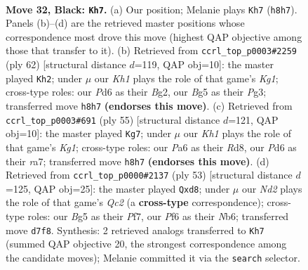 \documentclass[11pt]{article}
\begin{document}
\clearpage

\begin{figure}[p]\centering
\begin{subfigure}{0.46\textwidth}\centering
\resizebox{\linewidth}{!}{%
\newchessgame
\chessboard[
  setfen={rnR4k/3n4/p2p1p2/3P2b1/4P1P1/q1NQ4/4N3/4K3 b - - 1 32},
  showmover=false,
  pgfstyle=straightmove, color=movearrow, markmove={h8-h7}
]}
\caption{}
\end{subfigure}\hfill
\begin{subfigure}{0.46\textwidth}\centering
\resizebox{\linewidth}{!}{%
\newchessgame
\chessboard[
  setfen={2r1n1k1/5p2/q2p2p1/7p/2nQP3/6PP/4NPB1/2R3K1 w - - 1 32},
  showmover=false,
  pgfstyle=straightmove, color=movearrow, markmove={g1-h2}
]}
\caption{}
\end{subfigure}
\\[4pt]
\begin{subfigure}{0.46\textwidth}\centering
\resizebox{\linewidth}{!}{%
\newchessgame
\chessboard[
  setfen={3r2k1/R4p1p/Qp1n2p1/3q4/1P6/P4N1P/1b1N1PP1/6K1 b - - 0 28},
  showmover=false,
  pgfstyle=straightmove, color=movearrow, markmove={g8-g7}
]}
\caption{}
\end{subfigure}\hfill
\begin{subfigure}{0.46\textwidth}\centering
\resizebox{\linewidth}{!}{%
\newchessgame
\chessboard[
  setfen={3Rn1k1/2q2pp1/pn2p2p/8/2N1P2P/1P3NP1/4QP2/6K1 b - - 0 27},
  showmover=false,
  pgfstyle=straightmove, color=movearrow, markmove={c7-d8}
]}
\caption{}
\end{subfigure}
\caption{\textbf{Move 32, Black: \texttt{Kh7}.} (a) Our position; Melanie plays \texttt{Kh7} (\texttt{h8h7}). Panels (b)--(d) are the retrieved master positions whose correspondence most drove this move (highest QAP objective among those that transfer to it). (b) Retrieved from \texttt{ccrl\_top\_p0003\#2259} (ply 62) [structural distance $d$=119, QAP obj=10]: the master played \texttt{Kh2}; under $\mu$ our \emph{Kh1} plays the role of that game's \emph{Kg1}; cross-type roles: our \emph{P}d6 as their \emph{B}g2, our \emph{B}g5 as their \emph{P}g3; transferred move \texttt{h8h7} \textbf{(endorses this move)}. (c) Retrieved from \texttt{ccrl\_top\_p0003\#691} (ply 55) [structural distance $d$=121, QAP obj=10]: the master played \texttt{Kg7}; under $\mu$ our \emph{Kh1} plays the role of that game's \emph{Kg1}; cross-type roles: our \emph{P}a6 as their \emph{R}d8, our \emph{P}d6 as their \emph{r}a7; transferred move \texttt{h8h7} \textbf{(endorses this move)}. (d) Retrieved from \texttt{ccrl\_top\_p0000\#2137} (ply 53) [structural distance $d$=125, QAP obj=25]: the master played \texttt{Qxd8}; under $\mu$ our \emph{Nd2} plays the role of that game's \emph{Qc2} (a \textbf{cross-type} correspondence); cross-type roles: our \emph{B}g5 as their \emph{P}f7, our \emph{P}f6 as their \emph{N}b6; transferred move \texttt{d7f8}. Synthesis: 2 retrieved analogs transferred to \texttt{Kh7} (summed QAP objective 20, the strongest correspondence among the candidate moves); Melanie committed it via the \texttt{search} selector.}
\label{fig:thought-m63}
\end{figure}
\end{document}
